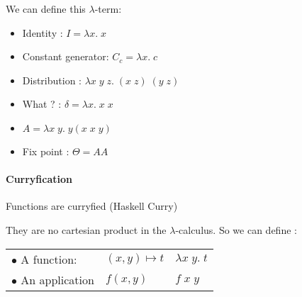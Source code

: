   \exam We can define this $\lambda$-term:

  \begin{itemize}
    \item Identity : $I = \lambda x.\; x$
    \item Constant generator: $C_c = \lambda x.\; c$
    \item Distribution : $\lambda x\; y\; z.\; (x\;z)\; (y\;z)$
    \item What ? : $\delta = \lambda x.\;x\;x$
    \item $A = \lambda x\;y.\; y(x\;x\;y)$
    \item Fix point : $\Theta = A A$ 
  \end{itemize}


  \paragraph{Curryfication} Functions are curryfied (Haskell Curry)

  They are no cartesian product in the $\lambda$-calculus. So we can define :

  \begin{center}
  \begin{tabular}{l l l}
    $\bullet$ A function: & $(x, y)\mapsto t$ & $\lambda x\;y.\; t$ \\
    $\bullet$ An application & $f(x, y)$ & $f\; x\; y$
  \end{tabular}
  \end{center}


